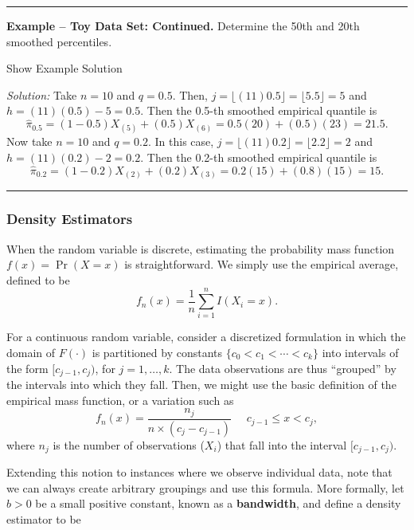 \documentclass[]{book}
\theoremstyle{definition}
\theoremstyle{definition}
\theoremstyle{definition}
\theoremstyle{remark}
\begin{document}
\begin{center}\rule{0.5\linewidth}{\linethickness}\end{center}

\textbf{Example -- Toy Data Set: Continued.} Determine the 50th and 20th
smoothed percentiles.

Show Example Solution

\hypertarget{toggleExampleToyp}{}
\emph{Solution:} Take \(n=10\) and \(q=0.5\). Then,
\(j=\lfloor(11)0.5 \rfloor= \lfloor5.5 \rfloor=5\) and
\(h=(11)(0.5)-5=0.5\). Then the 0.5-th smoothed empirical quantile is
\[\hat{\pi}_{0.5} = (1-0.5) X_{(5)} + (0.5) X_{(6)} = 0.5 (20) + (0.5)(23) = 21.5.\]
Now take \(n=10\) and \(q=0.2\). In this case,
\(j=\lfloor(11)0.2\rfloor=\lfloor 2.2 \rfloor=2\) and
\(h=(11)(0.2)-2=0.2\). Then the 0.2-th smoothed empirical quantile is
\[\hat{\pi}_{0.2} = (1-0.2) X_{(2)} + (0.2) X_{(3)} = 0.2 (15) + (0.8)(15) = 15.\]

\begin{center}\rule{0.5\linewidth}{\linethickness}\end{center}

\subsubsection{Density Estimators}\label{density-estimators}

When the random variable is discrete, estimating the probability mass
function \(f(x) = \Pr(X=x)\) is straightforward. We simply use the
empirical average, defined to be
\[f_n(x) = \frac{1}{n} \sum_{i=1}^n I(X_i = x).\]

For a continuous random variable, consider a discretized formulation in
which the domain of \(F(\cdot)\) is partitioned by constants
\(\{c_0 < c_1 < \cdots < c_k\}\) into intervals of the form
\([c_{j-1}, c_j)\), for \(j=1, \ldots, k\). The data observations are
thus ``grouped'' by the intervals into which they fall. Then, we might
use the basic definition of the empirical mass function, or a variation
such as
\[f_n(x) = \frac{n_j}{n \times (c_j - c_{j-1})}  \ \ \ \ \ \ c_{j-1} \le x < c_j,\]
where \(n_j\) is the number of observations (\(X_i\)) that fall into the
interval \([c_{j-1}, c_j)\).

Extending this notion to instances where we observe individual data,
note that we can always create arbitrary groupings and use this formula.
More formally, let \(b>0\) be a small positive constant, known as a
\textbf{bandwidth}, and define a density estimator to be
\end{document}
